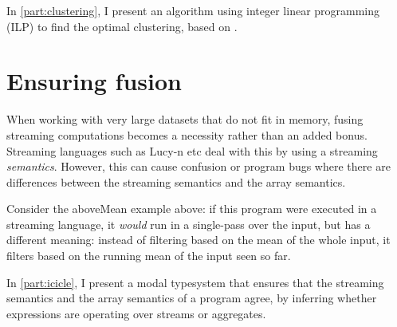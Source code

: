 In \autoref{part:clustering}, I present an algorithm using integer linear programming (ILP) to find the optimal clustering, based on \citet{megiddo1998optimal}.

\section{Ensuring fusion}

When working with very large datasets that do not fit in memory, fusing streaming computations becomes a necessity rather than an added bonus.
Streaming languages such as Lucy-n etc deal with this by using a streaming \emph{semantics}.
However, this can cause confusion or program bugs where there are differences between the streaming semantics and the array semantics.

Consider the aboveMean example above: if this program were executed in a streaming language, it \emph{would} run in a single-pass over the input, but has a different meaning: instead of filtering based on the mean of the whole input, it filters based on the running mean of the input seen so far.

In \autoref{part:icicle}, I present a modal typesystem that ensures that the streaming semantics and the array semantics of a program agree, by inferring whether expressions are operating over streams or aggregates.

